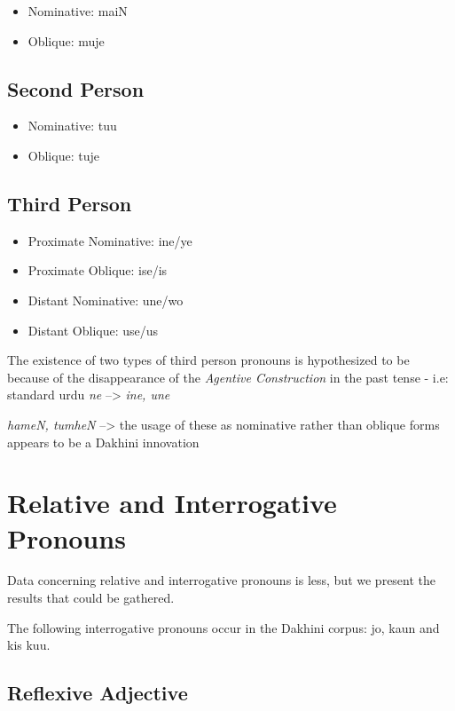 \documentclass[a4paper]{article}
\begin{document}
\begin{itemize}
\item
Nominative: maiN
\item
Oblique: muje
\end{itemize}

\subsection{Second Person}

\begin{itemize}
\item
Nominative: tuu
\item
Oblique: tuje
\end{itemize}

\subsection{Third Person}

\begin{itemize}
\item
Proximate Nominative: ine/ye
\item
Proximate Oblique: ise/is
\item
Distant Nominative: une/wo
\item
Distant Oblique: use/us
\end{itemize}

The existence of two types of third person pronouns is hypothesized to be because of the disappearance of the \emph{Agentive Construction} in the past tense - i.e: standard urdu \textit{ne} --> \textit{ine, une}

\textit{hameN, tumheN} --> the usage of these as nominative rather than oblique forms appears to be a Dakhini innovation



\section{Relative and Interrogative Pronouns}

Data concerning relative and interrogative pronouns is less, but we present the results that could be gathered.

The following interrogative pronouns occur in the Dakhini corpus: jo, kaun and kis kuu.

\subsection{Reflexive Adjective}
\end{document}
